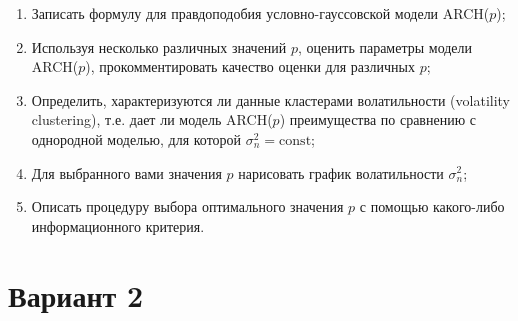 \documentclass[a4paper,14pt]{extreport}
\renewcommand{\=}[1]{\stackrel{#1}{=}} %
\begin{document}
\begin{enumerate}
	\begin{enumerate}
	\item Записать формулу для правдоподобия условно-гауссовской модели
	ARCH($p$);
	\item Используя несколько различных значений $p$,
	оценить параметры модели ARCH($p$),
	прокомментировать качество оценки для различных $p$;
	\item Определить, характеризуются ли данные кластерами волатильности
	(volatility clustering), т.е. дает ли модель ARCH($p$) 
	преимущества по сравнению с однородной моделью,
	для которой $\sigma^2_n = \mathrm{const}$;
	\item Для выбранного вами значения $p$ нарисовать график
	волатильности $\sigma^2_n$;
	\item Описать процедуру выбора оптимального значения $p$
	с помощью какого-либо информационного критерия.
	\end{enumerate}


\end{enumerate}


\newpage 

\section*{Вариант 2}
\end{document}
